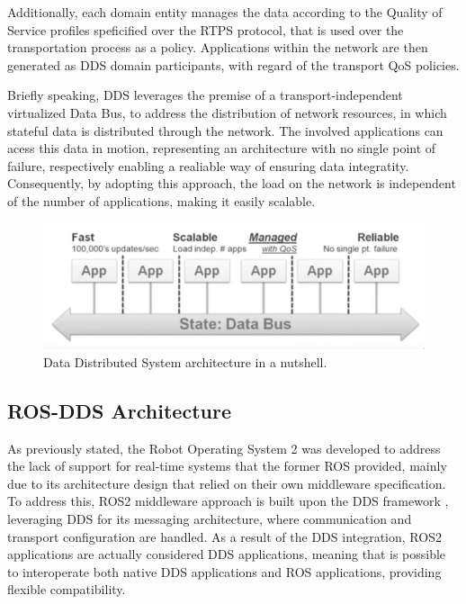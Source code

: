 Additionally, each domain entity manages the data according to the Quality of Service profiles speficified over the RTPS protocol, that is used over the transportation process as a policy. Applications within the network are then generated as DDS domain participants, with regard of the transport QoS policies. \cite{alaerjan2017modeling, maruyama2016exploring} 

Briefly speaking, DDS leverages the premise of a transport-independent virtualized Data Bus, to address the distribution of network resources, in which stateful data is distributed through the network. The involved applications can acess this data in motion, representing an architecture with no single point of failure, respectively enabling a realiable way of ensuring data integratity. Consequently, by adopting this approach, the load on the network is independent of the number of applications, making it easily scalable. %

\begin{figure}[H]
    \centering
    \includegraphics[width=0.6\linewidth]{images/dds-architecture.png}
    \caption{Data Distributed System architecture in a nutshell.}
    \label{fig:dds-architecture-nutshell}
\end{figure}


\subsection{ROS-DDS Architecture}

As previously stated, the Robot Operating System 2 was developed to address the lack of support for real-time systems that the former ROS provided, mainly due to its architecture design that relied on their own middleware specification. To address this, ROS2 middleware approach is built upon the DDS framework \cite{maruyama2016exploring}, leveraging DDS for its messaging architecture, where communication and transport configuration are handled. As a result of the DDS integration, ROS2 applications are actually considered DDS applications, meaning that is possible to interoperate both native DDS applications and ROS applications, providing flexible compatibility.

